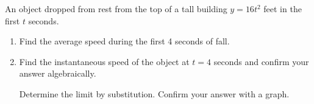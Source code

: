 \documentclass[11pt]{article}
\begin{document}
    \noindent An object dropped from rest from the top of a tall building $\displaystyle y = 16t^2$ feet in the first $\displaystyle t$ seconds.

    \begin{enumerate}

        \item Find the average speed during the first 4 seconds of fall.\\[2ex]
        \item Find the instantaneous speed of the object at $\displaystyle t = 4$ seconds and confirm your answer algebraically.\\[2ex]



        \vspace{2ex}

        \noindent Determine the limit by substitution. Confirm your answer with a graph.



        \vspace{2ex}


        \newpage


\end{enumerate}
\end{document}
